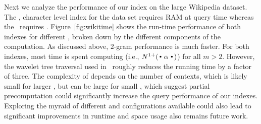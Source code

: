 Next we analyze the performance of our index on the large Wikipedia dataset.
The \singleCST, character level index for the data set requires  RAM
at query time whereas the \dualCST\ requires . Figure~\ref{fig:wikitime}
shows the run-time performance of both indexes for different \ngrams, broken
down by the different components of the computation. As discussed above,
$2$-gram performance is much faster. For both indexes, most time is spent
computing \nlplusfrontbackname (i.e., $\nlplus{\dotpatdot}$) for all $m>2$. However,
the wavelet tree traversal used in \singleCST\ roughly reduces the running time
by a factor of three. The complexity of \nlplusfrontbackname depends on the
number of contexts, which is likely small for larger \ngrams, but can be large
for small \ngrams, which suggest partial precomputation could significantly
increase the query performance of our indexes. Exploring the myraid of
different \CST and \CSA configurations available could also lead to 
significant improvements in runtime and space usage also 
remains future work.







